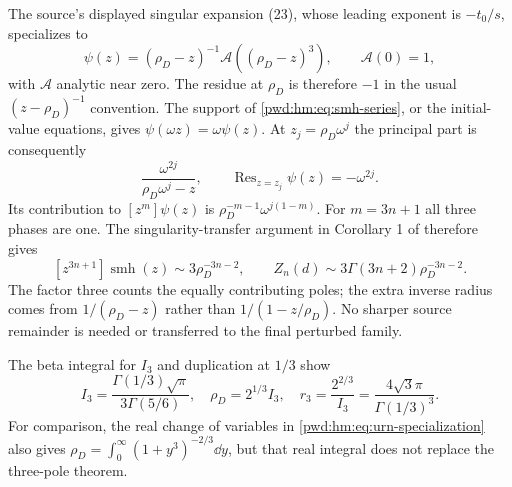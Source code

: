 \documentclass[11pt,letterpaper]{article}
\numberwithin{equation}{section}
\theoremstyle{remark}\newtheorem{remark}[theorem]{Remark}
\begin{document}
The source's displayed singular expansion (23), whose leading exponent is $-t_0/s$, specializes to
\begin{equation}\label{pwd:hm:eq:dixon-positive-pole}
 \psi(z)=(\rho_D-z)^{-1}\mathcal A((\rho_D-z)^3),\qquad\mathcal A(0)=1,
\end{equation}
with $\mathcal A$ analytic near zero. The residue at $\rho_D$ is therefore $-1$ in the usual $(z-\rho_D)^{-1}$ convention. The support of \eqref{pwd:hm:eq:smh-series}, or the initial-value equations, gives $\psi(\omega z)=\omega\psi(z)$. At $z_j=\rho_D\omega^j$ the principal part is consequently
\begin{equation}\label{pwd:hm:eq:dixon-pole-phases}
 \frac{\omega^{2j}}{\rho_D\omega^j-z},\qquad
 \operatorname{Res}_{z=z_j}\psi(z)=-\omega^{2j}.
\end{equation}
Its contribution to $[z^m]\psi(z)$ is
$\rho_D^{-m-1}\omega^{j(1-m)}$. For $m=3n+1$ all three phases are one. The singularity-transfer argument in Corollary 1 of \cite{urns} therefore gives
\begin{equation}\label{pwd:hm:eq:dixon-asymptotic}
 [z^{3n+1}]\operatorname{smh}(z)\sim3\rho_D^{-3n-2},\qquad
 Z_n(d)\sim3\Gamma(3n+2)\rho_D^{-3n-2}.
\end{equation}
The factor three counts the equally contributing poles; the extra inverse radius comes from $1/(\rho_D-z)$ rather than $1/(1-z/\rho_D)$. No sharper source remainder is needed or transferred to the final perturbed family.

The beta integral for $I_3$ and duplication at $1/3$ show
\begin{equation}\label{pwd:hm:eq:rho-I}
 I_3=\frac{\Gamma(1/3)\sqrt\pi}{3\Gamma(5/6)},\quad
 \rho_D=2^{1/3}I_3,\quad
 r_3=\frac{2^{2/3}}{I_3}=\frac{4\sqrt3\pi}{\Gamma(1/3)^3}.
\end{equation}
For comparison, the real change of variables in \eqref{pwd:hm:eq:urn-specialization} also gives
$\rho_D=\int_0^\infty(1+y^3)^{-2/3}\dd y$, but that real integral does not replace the three-pole theorem.
\end{document}
